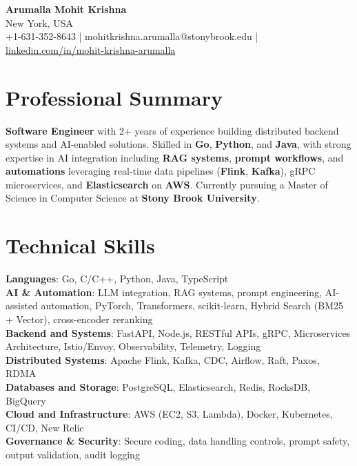 \documentclass[letterpaper,11pt]{article}
\begin{document}
\begin{center}
  {\Large \textbf{Arumalla Mohit Krishna}} \\
  New York, USA \\
  +1-631-352-8643 \enspace | \enspace mohitkrishna.arumalla@stonybrook.edu \enspace | \enspace \href{https://www.linkedin.com/in/mohit-krishna-arumalla}{linkedin.com/in/mohit-krishna-arumalla}
\end{center}

\section{Professional Summary}
  \begin{itemize}[leftmargin=0.15in, label={}]
    \small{\item{
     \textbf{Software Engineer} with 2+ years of experience building distributed backend systems and AI-enabled solutions. Skilled in \textbf{Go}, \textbf{Python}, and \textbf{Java}, with strong expertise in AI integration including \textbf{RAG systems}, \textbf{prompt workflows}, and \textbf{automations} leveraging real-time data pipelines (\textbf{Flink}, \textbf{Kafka}), gRPC microservices, and \textbf{Elasticsearch} on \textbf{AWS}. Currently pursuing a Master of Science in Computer Science at \textbf{Stony Brook University}.
    }}
  \end{itemize}
\vspace{-16pt}

\section{Technical Skills}
 \begin{itemize}[leftmargin=0.15in, label={}]
    \small{\item{
     \textbf{Languages}: Go, C/C++, Python, Java, TypeScript \\
     \textbf{AI \& Automation}: LLM integration, RAG systems, prompt engineering, AI-assisted automation, PyTorch, Transformers, scikit-learn, Hybrid Search (BM25 + Vector), cross-encoder reranking \\
     \textbf{Backend and Systems}: FastAPI, Node.js, RESTful APIs, gRPC, Microservices Architecture, Istio/Envoy, Observability, Telemetry, Logging \\
     \textbf{Distributed Systems}: Apache Flink, Kafka, CDC, Airflow, Raft, Paxos, RDMA \\
     \textbf{Databases and Storage}: PostgreSQL, Elasticsearch, Redis, RocksDB, BigQuery \\
     \textbf{Cloud and Infrastructure}: AWS (EC2, S3, Lambda), Docker, Kubernetes, CI/CD, New Relic \\
     \textbf{Governance \& Security}: Secure coding, data handling controls, prompt safety, output validation, audit logging
    }}
 \end{itemize}
\vspace{-16pt}
\end{document}

